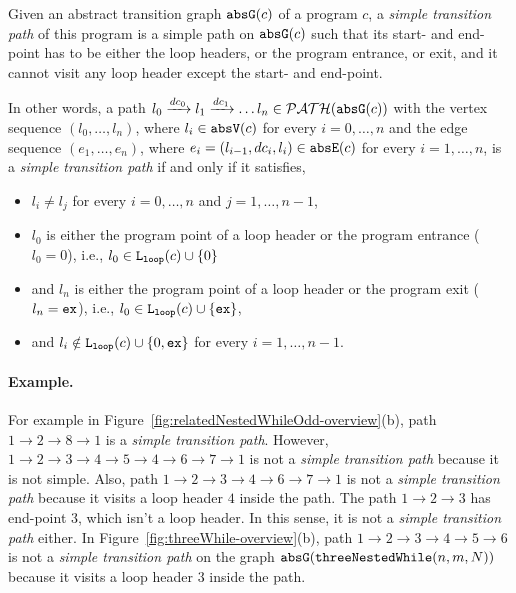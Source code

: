 \begin{defn}
 \label{def:tpath}
Given an abstract transition graph $\mathtt{abs}{\mathtt{G}}(c)$ of a program $c$,
a \emph{simple transition path} of this program
is a
simple path on $\mathtt{abs}{\mathtt{G}}(c)$ such that 
its start- and end-point
has to be either the
loop headers, or the program entrance, or exit,
and it cannot visit any loop header except the start- and end-point.

In other words, a path $l_0 \xrightarrow{dc_0} l_1 \xrightarrow{dc_1} \ldots l_n \in \mathcal{PATH}(\mathtt{abs}{\mathtt{G}}(c))$ with the
vertex sequence $(l_0, \ldots, l_n)$, where $l_i \in \mathtt{abs}{\mathtt{V}}(c)$ for every $i = 0, \ldots, n$ and
%
the edge sequence $(e_1, \ldots, e_n)$, where $e_i = (l_{i - 1}, dc_i, l_{i}) \in \mathtt{abs}{\mathtt{E}}(c)$ for every $i = 1, \ldots, n$,
%
is a \emph{simple transition path} if and only if it satisfies,
\begin{itemize}
 \item $l_i \neq l_j$ for every $i = 0, \ldots, n$ and $j = 1, \ldots, {n - 1}$,
 \item $l_0$ is either the program point of a loop header or the program entrance ($l_0 = 0$),
 i.e., $l_0 \in \mathtt{L}_{\mathtt{loop}}(c) \cup \{ 0 \}$
 \item and $l_n$ is either the program point of a loop header or the program exit ($l_n = \mathtt{ex}$),
 i.e., $l_0 \in \mathtt{L}_{\mathtt{loop}}(c) \cup \{ \mathtt{ex} \}$,
 \item and $l_i \notin \mathtt{L}_{\mathtt{loop}}(c) \cup \{ 0, \mathtt{ex} \}$ for every $i = 1, \ldots, n-1$.
\end{itemize}
\end{defn}


\paragraph{Example.}
For example in Figure~\ref{fig:relatedNestedWhileOdd-overview}(b), path $1 \to 2 \to 8 \to 1$ is a \emph{simple transition path}.
However, $1 \to 2 \to 3 \to 4 \to 5 \to 4 \to 6 \to 7 \to 1$ is not a \emph{simple transition path} because it is not simple.
Also, path $1 \to 2 \to 3 \to 4 \to 6 \to 7 \to 1$ is not a \emph{simple transition path} because it visits a loop header $4$ inside the path. 
The path $1 \to 2 \to 3$ has end-point $3$, which isn't a loop header. In this sense, it is not a \emph{simple transition path} either.
In Figure~\ref{fig:threeWhile-overview}(b), path $1 \to 2 \to 3 \to 4 \to 5 \to 6$ is not a \emph{simple transition path} on the graph $\mathtt{abs}{\mathtt{G}}(\mathtt{threeNestedWhile}(n, m, N))$ because it visits a loop header $3$ inside the path.

